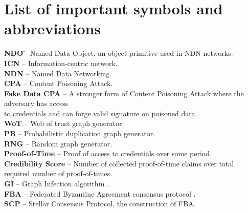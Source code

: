 \chapter*{List of important symbols and abbreviations}
\begin{tabbing}

  \textbf{NDO}\tab[3cm] \=-- Named Data Object, an object primitive used in NDN networks.\\
  \textbf{ICN} \>-- Information-centric network.\\
  \textbf{NDN} \>-- Named Data Networking.\\
  \textbf{CPA} \>-- Content Poisoning Attack.\\
  \textbf{Fake Data CPA} \>-- A stronger form of Content Poisoning Attack where the adversary has access \\
  \>   to credentials and can forge valid signature on poisoned data.\\
  \textbf{WoT} \>-- Web of trust graph generator.\\
  \textbf{PB} \>-- Probabilistic duplication graph generator.\\
  \textbf{RNG} \>-- Random graph generator.\\
  \textbf{Proof-of-Time} \>-- Proof of access to credentials over some period.\\
  \textbf{Credibility Score} \>-- Number of collected proof-of-time claims over total required number of proof-of-times.\\
  \textbf{GI} \>-- Graph Infection algorithm \cite{konorski2019mitigating}.\\
  \textbf{FBA} \>-- Federated Byzantine Agreement consensus protocol \cite{mazieres2015stellar}.\\
  \textbf{SCP} \>-- Stellar Consensus Protocol, the construction of FBA.\\
  \end{tabbing}